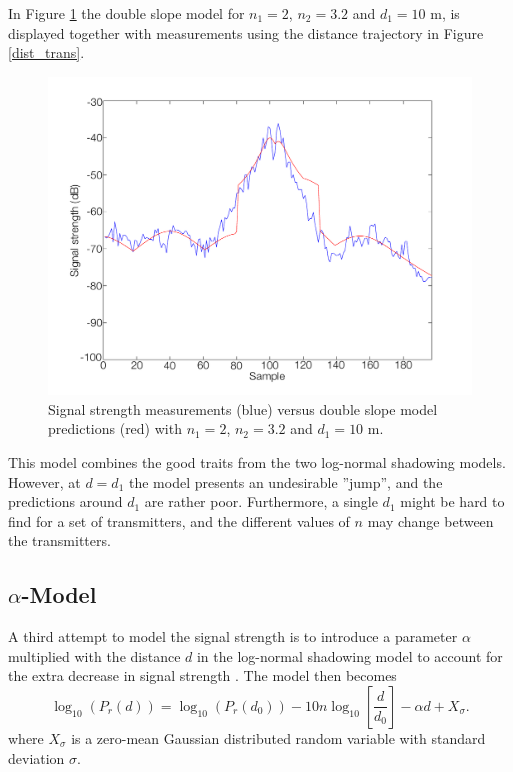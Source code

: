\documentclass{LTHthesis}
\begin{document}
In Figure \ref{double_slope} the double slope model for $n_1=2$, $n_2=3.2$ and $d_1=10$ m, is displayed together with measurements using the distance trajectory in Figure \ref{dist_trans}.
%
\begin{figure}[!hbt]

\includegraphics[width=1\textwidth ]{images/signal_model/double_slope}
\caption{Signal strength measurements (blue) versus double slope model predictions (red) with $n_1=2$, $n_2=3.2$ and $d_1=10$ m.}\label{double_slope}
\end{figure}

This model combines the good traits from the two log-normal shadowing models. However, at $d=d_1$ the model presents an undesirable ''jump'', and the predictions around $d_1$ are rather poor. Furthermore, a single $d_1$ might be hard to find for a set of transmitters, and the different values of $n$ may change between the transmitters.
%
\subsection{$\alpha$-Model} %
%
A third attempt to model the signal strength is to introduce a parameter $\alpha$ multiplied with the distance $d$ in the log-normal shadowing model to account for the extra decrease in signal strength \cite{karlsson92}. The model then becomes
%
\begin{equation}
\log_{10}({P_r(d)})=\log_{10}({P_r(d_0)})-10n\log_{10}\left[{\frac{d}{d_0}}\right] - \alpha d+ X_\sigma.
\end{equation}
%
where $X_\sigma$ is a zero-mean Gaussian distributed random variable with standard deviation $\sigma$.
\end{document}
